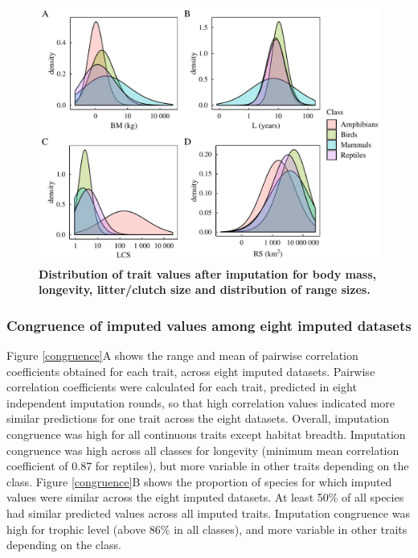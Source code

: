 \begin{figure}[h!]
\centering
\includegraphics[scale=0.7]{figures/chapter2/Imputation_errors/Distributions}
\caption[Distribution of trait values after imputation for body mass, longevity, litter/clutch size and distribution of range sizes]{\textbf{Distribution of trait values after imputation for body mass, longevity, litter/clutch size and distribution of range sizes.}}
\label{traitdist}
\end{figure}



\subsubsection{Congruence of imputed values among eight imputed datasets}

Figure \ref{congruence}A shows the range and mean of pairwise correlation coefficients obtained for each trait, across eight imputed datasets. Pairwise correlation coefficients were calculated for each trait, predicted in eight independent imputation rounds, so that high correlation  values indicated more similar predictions for one trait across the eight datasets. Overall, imputation congruence was high for all continuous traits except habitat breadth. Imputation congruence was high across all classes for longevity (minimum mean correlation coefficient of 0.87 for reptiles), but more variable in other traits depending on the class.
Figure \ref{congruence}B shows the proportion of species for which imputed values were similar across the eight imputed datasets. At least 50\% of all species had similar predicted values across all imputed traits. Imputation congruence was high for trophic level (above 86\% in all classes), and more variable in other traits depending on the class. 

